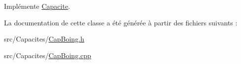 Implémente \hyperlink{class_capacite_a6f5e6efda11f80ab8538e23f5bdc6e79}{Capacite}.



La documentation de cette classe a été générée à partir des fichiers suivants \+:\begin{DoxyCompactItemize}
\item 
src/\+Capacites/\hyperlink{_cap_boing_8h}{Cap\+Boing.\+h}\item 
src/\+Capacites/\hyperlink{_cap_boing_8cpp}{Cap\+Boing.\+cpp}\end{DoxyCompactItemize}

